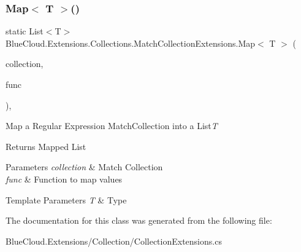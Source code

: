 \subsubsection{\texorpdfstring{Map$<$ T $>$()}{Map< T >()}}
{\footnotesize\ttfamily static List$<$T$>$ Blue\+Cloud.\+Extensions.\+Collections.\+Match\+Collection\+Extensions.\+Map$<$ T $>$ (\begin{DoxyParamCaption}\item[{this Match\+Collection}]{collection,  }\item[{Func$<$ Match, T $>$}]{func }\end{DoxyParamCaption})\hspace{0.3cm}{\ttfamily [inline]}, {\ttfamily [static]}}



Map a Regular Expression Match\+Collection into a List{\itshape T}  

\begin{DoxyReturn}{Returns}
Mapped List
\end{DoxyReturn}

\begin{DoxyParams}{Parameters}
{\em collection} & Match Collection\\
\hline
{\em func} & Function to map values\\
\hline
\end{DoxyParams}

\begin{DoxyTemplParams}{Template Parameters}
{\em T} & Type\\
\hline
\end{DoxyTemplParams}


The documentation for this class was generated from the following file\+:\begin{DoxyCompactItemize}
\item 
Blue\+Cloud.\+Extensions/\+Collection/Collection\+Extensions.\+cs\end{DoxyCompactItemize}
